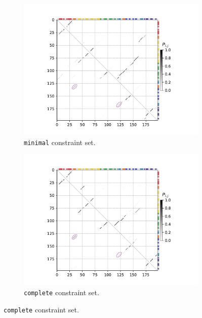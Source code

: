\documentclass[../../master.tex]{subfiles}
\begin{document}
\begin{figure}[!ht]
	\centering
	\begin{subfigure}[t]{0.5\textwidth}
		\centering
		\includegraphics[trim=55 10 70 10, clip, width=\textwidth]{pic/results/designs/dotplots/examples/minimal-range.pdf}
		\caption{\texttt{minimal} constraint set.
		}\label{fig:bpp_pseven:a}
	\end{subfigure}%
	\begin{subfigure}[t]{0.5\textwidth}
		\centering
		\includegraphics[trim=55 10 70 10, clip, width=\textwidth]{pic/results/designs/dotplots/examples/complete-range.pdf}
		\caption{\texttt{complete} constraint set.
		}\label{fig:bpp_pseven:b}
	\end{subfigure}

\end{figure}
\end{document}
